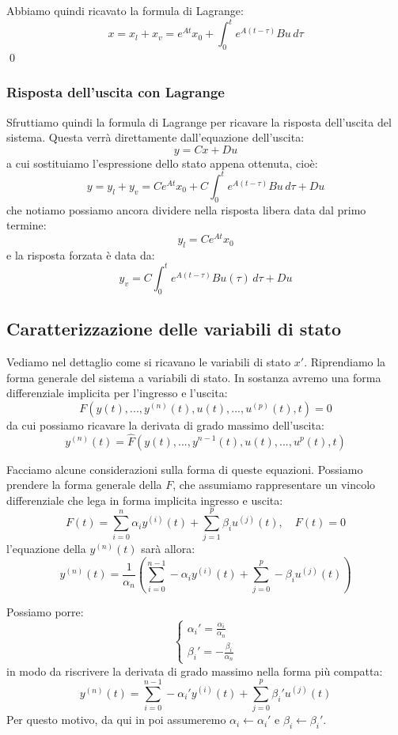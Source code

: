 \documentclass[a4paper,11pt]{article}
\begin{document}
Abbiamo quindi ricavato la formula di Lagrange:
$$
x = x_l + x_v = e^{At} x_0 + \int_0^t e^{A(t - \tau)} Bu \, d\tau
$$
\qed

\subsubsection{Risposta dell'uscita con Lagrange}
Sfruttiamo quindi la formula di Lagrange per ricavare la risposta dell'uscita del sistema.
Questa verrà direttamente dall'equazione dell'uscita:
$$
y = Cx + Du
$$
a cui sostituiamo l'espressione dello stato appena ottenuta, cioè:
$$
y = y_l + y_v = C e^{At} x_0 + C \int_0^t e^{A(t - \tau)} Bu \, d\tau + Du
$$
che notiamo possiamo ancora dividere nella risposta libera data dal primo termine:
$$
y_l = C e^{At} x_0 
$$
e la risposta forzata è data da:
$$
y_v = C \int_0^t e^{A(t - \tau)} Bu(\tau) \, d\tau + Du
$$

\subsection{Caratterizzazione delle variabili di stato}
Vediamo nel dettaglio come si ricavano le variabili di stato $x'$.
Riprendiamo la forma generale del sistema a variabili di stato.
In sostanza avremo una forma differenziale implicita per l'ingresso e l'uscita: 
$$
F \left( y(t), ..., y^{(n)}(t), u(t), ..., u^{(p)}(t), t \right) = 0
$$
da cui possiamo ricavare la derivata di grado massimo dell'uscita: 
$$
y^{(n)}(t) = \hat{F} \left( y(t), ..., y^{n-1}(t), u(t), ..., u^p(t), t \right)
$$

\par\smallskip

Facciamo alcune considerazioni sulla forma di queste equazioni.
Possiamo prendere la forma generale della $F$, che assumiamo rappresentare  un vincolo differenziale che lega in forma implicita ingresso e uscita:
$$
F(t) = \sum_{i = 0}^{n} \alpha_i y^{(i)} (t) + \sum_{j = 1}^{p} \beta_i u^{(j)} (t), \quad F(t) = 0
$$
l'equazione della $y^{(n)} (t)$ sarà allora:
$$
y^{(n)} (t) = \frac{1}{\alpha_n} \left( \sum_{i = 0}^{n - 1} - \alpha_i y^{(i)} (t) + \sum_{j = 0}^p - \beta_i u^{(j)} (t) \right)
$$

Possiamo porre:
\[
	\begin{cases}		
		\alpha_i ' = \frac{\alpha_i}{\alpha_n} \\ 
		\beta_i ' = - \frac{\beta_i}{\alpha_n}
	\end{cases}
\]
in modo da riscrivere la derivata di grado massimo nella forma più compatta:
$$
y^{(n)} (t) = \sum_{i = 0}^{n - 1} - \alpha_i ' y^{(i)} (t) + \sum_{j = 0}^p  \beta_i ' u^{(j)} (t) 
$$
Per questo motivo, da qui in poi assumeremo $\alpha_i \leftarrow \alpha_i '$ e $\beta_i \leftarrow \beta_i '$.
\end{document}
